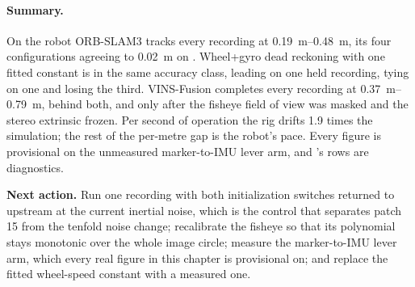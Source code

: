 \documentclass[11pt,a4paper,notitlepage]{report}
\begin{document}
\paragraph{Summary.} On the robot ORB-SLAM3 tracks every recording at
\SIrange{0.19}{0.48}{\metre}, its four configurations agreeing to
\SI{0.02}{\metre} on . Wheel+gyro dead reckoning with one fitted constant is in
the same accuracy class, leading on one held recording, tying on one and
losing the third. VINS-Fusion completes every recording at
\SIrange{0.37}{0.79}{\metre}, behind both, and only after the fisheye field of
view was masked and the stereo extrinsic frozen. Per second of operation the
rig drifts \num{1.9} times the simulation; the rest of the per-metre gap is
the robot's pace. Every figure is provisional on the unmeasured marker-to-IMU
lever arm, and 's rows are diagnostics.

\textbf{Next action.} Run one  recording with both initialization
switches returned to upstream at the current inertial noise, which is the
control that separates patch 15 from the tenfold noise change; recalibrate
the fisheye so that its polynomial stays monotonic over the whole image
circle; measure the marker-to-IMU lever arm, which every real figure in this chapter is
provisional on; and replace the fitted wheel-speed constant with a measured
one.

\FloatBarrier
\end{document}
